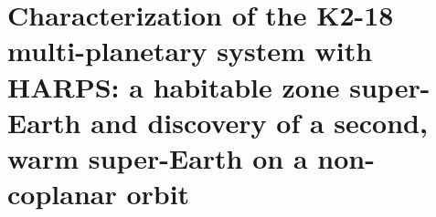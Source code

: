 \chapter[RV characterization of the K2-18 planetary system]{Characterization of the K2-18 multi-planetary system with HARPS: a habitable zone super-Earth and discovery of a second, warm super-Earth on a non-coplanar orbit} \label{chap:k2181}


